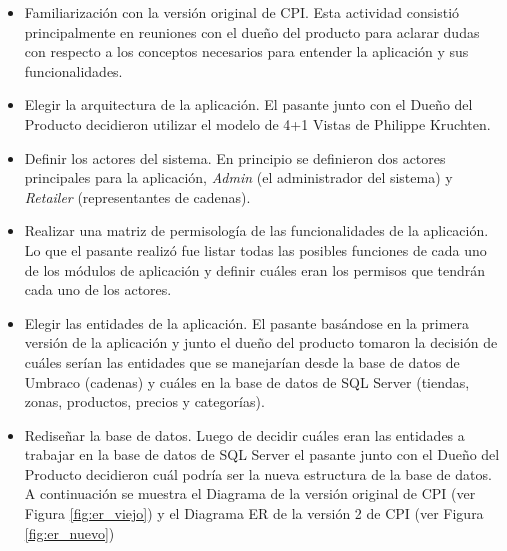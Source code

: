 \begin{itemize}
   \item Familiarización con la versión original de CPI. Esta actividad consistió principalmente en reuniones con el dueño del producto para aclarar dudas con respecto a los conceptos necesarios para entender la aplicación y sus funcionalidades.
   \item Elegir la arquitectura de la aplicación. El pasante junto con el Dueño del Producto decidieron utilizar el modelo de 4+1 Vistas de Philippe Kruchten.
   \item Definir los actores del sistema. En principio se definieron dos actores principales para la aplicación, \textit{Admin} (el administrador del sistema) y \textit{Retailer} (representantes de cadenas).
   \item Realizar una matriz de permisología de las funcionalidades de la aplicación. Lo que el pasante realizó fue listar todas las posibles funciones de cada uno de los módulos de aplicación y definir cuáles eran los permisos que tendrán cada uno de los actores.
   \item Elegir las entidades de la aplicación. El pasante basándose en la primera versión de la aplicación y junto el dueño del producto tomaron la decisión de cuáles serían las entidades que se manejarían desde la base de datos de Umbraco (cadenas) y cuáles en la base de datos de SQL Server (tiendas, zonas, productos, precios y categorías).
   \item Rediseñar la base de datos. Luego de decidir cuáles eran las entidades a trabajar en la base de datos de SQL Server el pasante junto con el Dueño del Producto decidieron cuál podría ser la nueva estructura de la base de datos. A continuación se muestra el Diagrama de la versión original de CPI (ver Figura \ref{fig:er_viejo}) y el Diagrama ER de la versión 2 de CPI (ver Figura \ref{fig:er_nuevo})
        \begin{figure}[hbt]
        \begin{center}

\end{center}
\end{figure}
\end{itemize}
